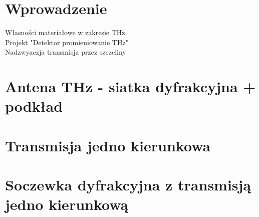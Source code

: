 \section{Wprowadzenie}
Własności materiałowe w zakresie THz\\
Projekt "Detektor promieniowanie THz"\\
Nadzwyaczja transmisja przez szczeliny\\
\section{Antena THz - siatka dyfrakcyjna + podkład}

\section{Transmisja jedno kierunkowa}
\section{Soczewka dyfrakcyjna z transmisją jedno kierunkową}


